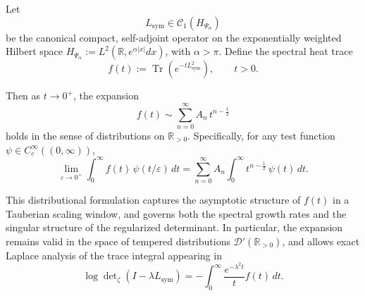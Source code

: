\begin{lemma}
\label{lem:distributional-trace-asymptotics}
Let
\[
L_{\mathrm{sym}} \in \mathcal{C}_1(H_{\Psi_\alpha})
\]
be the canonical compact, self-adjoint operator on the exponentially weighted Hilbert space \( H_{\Psi_\alpha} := L^2(\mathbb{R}, e^{\alpha|x|} dx) \), with \( \alpha > \pi \). Define the spectral heat trace
\[
f(t) := \operatorname{Tr}(e^{-t L_{\mathrm{sym}}^2}), \qquad t > 0.
\]

Then as \( t \to 0^+ \), the expansion
\[
f(t) \sim \sum_{n=0}^\infty A_n \, t^{n - \frac{1}{2}}
\]
holds in the sense of distributions on \( \mathbb{R}_{>0} \). Specifically, for any test function \( \psi \in C_c^\infty((0, \infty)) \),
\[
\lim_{\varepsilon \to 0^+} \int_0^\infty f(t) \, \psi(t/\varepsilon) \, dt
= \sum_{n=0}^\infty A_n \int_0^\infty t^{n - \frac{1}{2}} \, \psi(t)\, dt.
\]

\medskip
\noindent
This distributional formulation captures the asymptotic structure of \( f(t) \) in a Tauberian scaling window, and governs both the spectral growth rates and the singular structure of the regularized determinant. In particular, the expansion remains valid in the space of tempered distributions \( \mathcal{D}'(\mathbb{R}_{>0}) \), and allows exact Laplace analysis of the trace integral appearing in
\[
\log \det\nolimits_{\zeta}(I - \lambda L_{\mathrm{sym}}) = - \int_0^\infty \frac{e^{-\lambda^2 t}}{t} f(t) \, dt.
\]
\end{lemma}
